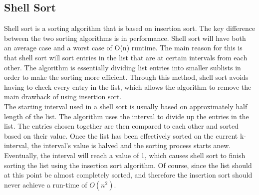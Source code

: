 \subsection{Shell Sort}
Shell sort is a sorting algorithm that is based on insertion sort. The key difference between the two sorting algorithms is in performance. Shell sort will have both an average case and a worst case of O(n) runtime. The main reason for this is that shell sort will sort entries in the list that are at certain intervals from each other. The algorithm is essentially dividing list entries into smaller sublists in order to make the sorting more efficient. Through this method, shell sort avoids having to check every entry in the list, which allows the algorithm to remove the main drawback of using insertion sort.
\\[11pt]
The starting interval used in a shell sort is usually based on approximately half length of the list. The algorithm uses the interval to divide up the entries in the list. The entries chosen together are then compared to each other and sorted based on their value. Once the list has been effectively sorted on the current k-interval, the interval's value is halved and the sorting process starts anew. Eventually, the interval will reach a value of 1, which causes shell sort to finish sorting the list using the insertion sort algorithm. Of course, since the list should at this point be almost completely sorted, and therefore the insertion sort should never achieve a run-time of $O(n^2)$.